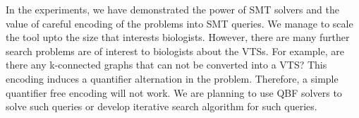 In the experiments, we have demonstrated the power of SMT solvers and the value
of careful encoding of the problems into SMT queries.
%
We manage to scale the tool upto the size that interests biologists.
%
However, there are many further search problems are of interest to
biologists about the VTSs.
%
For example, are there any k-connected graphs that can not be
converted into a VTS?
%
This encoding induces a quantifier alternation in the problem.
%
Therefore, a simple quantifier free encoding will not work.
%
We are planning to use QBF solvers to solve such queries or develop
iterative search algorithm for such queries.
%





